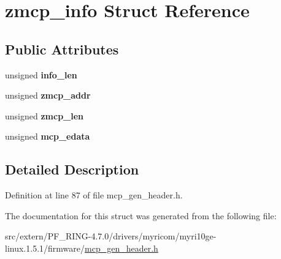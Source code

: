 \hypertarget{structzmcp__info}{
\section{zmcp\_\-info Struct Reference}
\label{structzmcp__info}
}
\subsection*{Public Attributes}
\begin{DoxyCompactItemize}
\item 
\hypertarget{structzmcp__info_a3246f37d1df8adc1ceb122761e42c942}{
unsigned {\bfseries info\_\-len}}
\label{structzmcp__info_a3246f37d1df8adc1ceb122761e42c942}

\item 
\hypertarget{structzmcp__info_a7fc93b02f1d0a02950d715873f81b303}{
unsigned {\bfseries zmcp\_\-addr}}
\label{structzmcp__info_a7fc93b02f1d0a02950d715873f81b303}

\item 
\hypertarget{structzmcp__info_ac470e87ed0564b5bb90a7d94cbc8b9b5}{
unsigned {\bfseries zmcp\_\-len}}
\label{structzmcp__info_ac470e87ed0564b5bb90a7d94cbc8b9b5}

\item 
\hypertarget{structzmcp__info_a28691dda85630c9fd6c8de36accf0fdd}{
unsigned {\bfseries mcp\_\-edata}}
\label{structzmcp__info_a28691dda85630c9fd6c8de36accf0fdd}

\end{DoxyCompactItemize}


\subsection{Detailed Description}


Definition at line 87 of file mcp\_\-gen\_\-header.h.



The documentation for this struct was generated from the following file:\begin{DoxyCompactItemize}
\item 
src/extern/PF\_\-RING-\/4.7.0/drivers/myricom/myri10ge-\/linux.1.5.1/firmware/\hyperlink{mcp__gen__header_8h}{mcp\_\-gen\_\-header.h}\end{DoxyCompactItemize}
